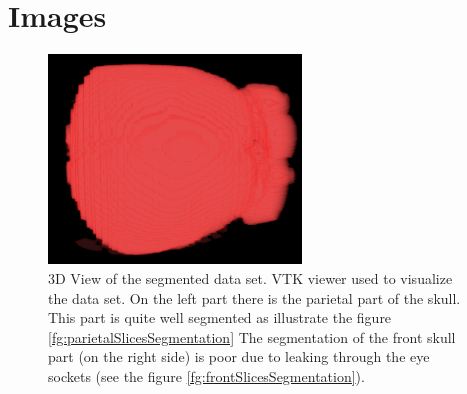 \chapter{Images}

\begin{figure}[h]
    \centering
    \includegraphics[width=0.6\textwidth]{data/png/3d}
    \caption[3D view of segmented skull data set]
{
3D View of the segmented data set.
VTK viewer used to visualize the data set.
On the left part there is the parietal part of the skull.
This part is quite well segmented as illustrate the figure \ref{fg:parietalSlicesSegmentation}
The segmentation of the front skull part (on the right side) is poor due to leaking through the eye sockets (see the figure \ref{fg:frontSlicesSegmentation}).
}
    \label{fg:series3d}
\end{figure}

